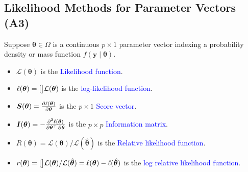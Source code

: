 \documentclass[oneside]{book}\usepackage[]{graphicx}\usepackage[svgnames]{xcolor}
\let\log\relax%
\providecommand{\Vector}[1]{\bm{#1}}%
\providecommand{\Matrix}[1]{\bm{#1}}
\begin{document}
\subsection*{Likelihood Methods for Parameter Vectors (A3)}
Suppose $ \Vector{\theta}\in \Omega $ is a continuous $ p\times 1 $ parameter vector indexing a probability density
or mass function $ f(\Vector{y}\mid\Vector{\theta}) $.
\begin{itemize}
      \item $ \mathcal{L}( \Vector{\theta}) $ is the \textcolor{Blue}{Likelihood function}.
      \item $ \ell( \Vector{\theta})=\log[\big]{\mathcal{L}(\Vector{\theta})} $ is the \textcolor{Blue}{log-likelihood function}.
      \item $ \Vector{S}(\Vector{\theta})=\pdv{\ell( \Vector{\theta})}{ \Vector{\theta}} $ is the $ p\times 1 $ \textcolor{Blue}{Score vector}.
      \item $ \Matrix{I}(\Vector{\theta})=-\pdv{\ell(\Vector{\theta})}{ \Vector{\theta}^\top,\Vector{\theta}} $ is the $ p\times p $ \textcolor{Blue}{Information matrix}.
      \item $ R(\Vector{\theta})=\mathcal{L}(\Vector{\theta})/\mathcal{L}(\hat{ \Vector{\theta}}) $ is the \textcolor{Blue}{Relative likelihood function}.
      \item $ r(\Vector{\theta})=\log[\big]{\mathcal{L}(\Vector{\theta})/\mathcal{L}(\hat{\Vector{\theta}})}=\ell(\Vector{\theta})-\ell(\hat{\Vector{\theta}}) $ is the
            \textcolor{Blue}{log relative likelihood function}.
\end{itemize}
\end{document}
